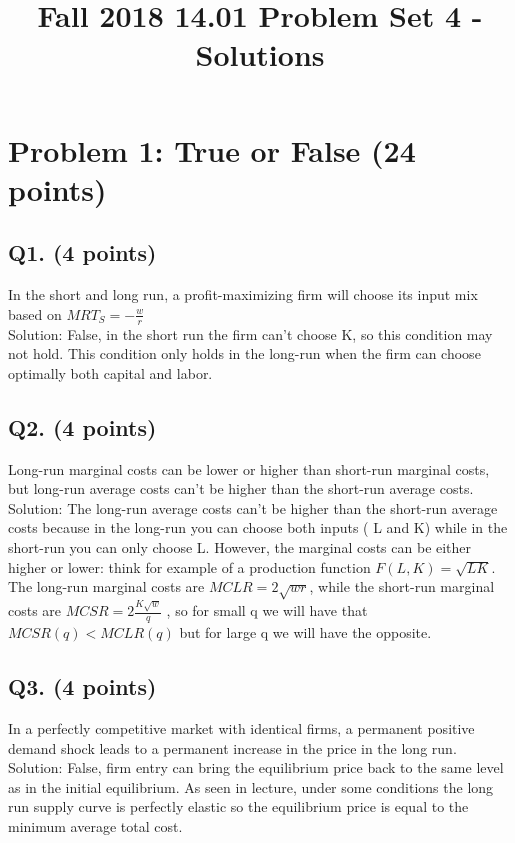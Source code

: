 \documentclass[11pt,a4paper]{article}
\title{{Fall 2018 14.01 Problem Set 4 - Solutions}}
\begin{document}
\maketitle

\section*{Problem 1: True or False (24 points)}

\subsection*{Q1. (4 points)}
In the short and long run, a profit-maximizing firm will choose its input mix based on $MRT_S = -\frac{w}{r}$\\
Solution: False, in the short run the firm can’t choose K, so this condition may not hold. This condition only holds in the long-run when the firm can choose optimally both capital and labor.

\subsection*{Q2. (4 points)}
Long-run marginal costs can be lower or higher than short-run marginal costs, but long-run average costs can’t be higher than the short-run average costs.
Solution: The long-run average costs can’t be higher than the short-run average costs because in the long-run you can choose both inputs ( L and K) while in the short-run you can only choose L. However, the marginal costs can be either higher or lower: think for example of a production function $F (L, K) = \sqrt{LK}$. The long-run marginal costs are $MCLR = 2 \sqrt{wr}$, while the short-run marginal costs are $MCSR = 2 \frac{K\sqrt{w}}{q}$ , so for small q we will have that $MCSR (q) < MCLR (q)$ but  for large q we will have the opposite.

\subsection*{Q3. (4 points)}
In a perfectly competitive market with identical firms, a permanent positive demand shock leads to a permanent increase in the price in the long run.
Solution: False, firm entry can bring the equilibrium price back to the same level as in the initial equilibrium. As seen in lecture, under some conditions the long run supply curve is perfectly elastic so the equilibrium price is equal to the minimum average total cost.
\end{document}
